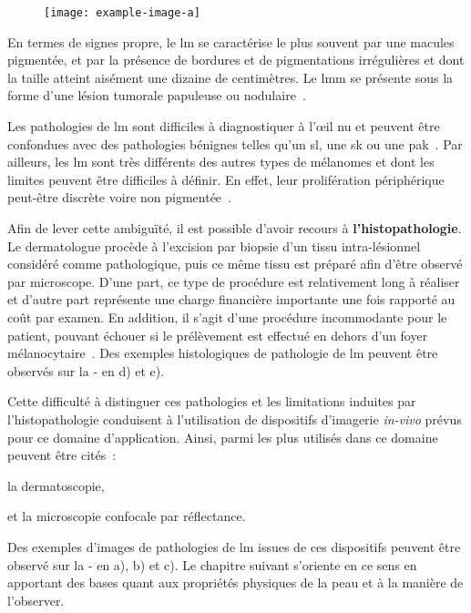 \begin{figure}[H]
    \centering
    \texttt{[image: example-image-a]}
    \caption{}
    \label{fig:scheme_lm_stages}
\end{figure}\par

En termes de signes propre, le \gls{lm} se caractérise le plus souvent par une macules pigmentée, et par la présence de bordures et de pigmentations irrégulières et dont la taille atteint aisément une dizaine de centimètres. Le \gls{lmm} se présente sous la forme d'une lésion tumorale papuleuse ou nodulaire~\cite{Mckenna2006, LeGal2011}.\par

Les pathologies de \gls{lm} sont difficiles à diagnostiquer à l’œil nu et peuvent être confondues avec des pathologies bénignes telles qu'un \gls{sl}, une \gls{sk} ou une \gls{pak}~\cite{LeDuff2014}. Par ailleurs, les \gls{lm} sont très différents des autres types de mélanomes  et dont les limites peuvent être difficiles à définir. En effet, leur prolifération périphérique peut-être discrète voire non pigmentée~\cite{LeGal2011}.\par


Afin de lever cette ambiguïté, il est possible d'avoir recours à \textbf{l'histopathologie}. Le dermatologue procède à l'excision par biopsie d'un tissu intra-lésionnel considéré comme pathologique, puis ce même tissu est préparé afin d'être observé par microscope. D'une part, ce type de procédure est relativement long à réaliser et d'autre part représente une charge financière importante une fois rapporté au coût par examen. En addition, il s'agit d'une procédure incommodante pour le patient, pouvant échouer si le prélèvement est effectué en dehors d'un foyer mélanocytaire~\cite{LeGal2011}. Des exemples histologiques de pathologie de \gls{lm} peuvent être observés sur la  - en d) et e).\par

Cette difficulté à distinguer ces pathologies et les limitations induites par l'histopathologie conduisent à l'utilisation de dispositifs d'imagerie \textit{in-vivo} prévus pour ce domaine d'application. Ainsi, parmi les plus utilisés dans ce domaine peuvent être cités~:
\begin{inlinerate}
    \item la dermatoscopie,
    \item et la microscopie confocale par réflectance.
\end{inlinerate} Des exemples d'images de pathologies de \gls{lm} issues de ces dispositifs peuvent être observé sur la  - en a), b) et c). Le chapitre suivant s'oriente en ce sens en apportant des bases quant aux propriétés physiques de la peau et à la manière de l'observer.\par

